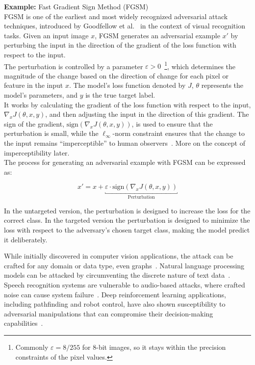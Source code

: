 \documentclass[a4paper, oneside]{discothesis}
\begin{document}
\begin{highlightbox}
	\textbf{Example:} Fast Gradient Sign Method (FGSM) \\

	FGSM is one of the earliest and most widely recognized adversarial attack techniques, introduced by Goodfellow et al.~\cite{goodfellow2014explaining} in the context of visual recognition tasks. Given an input image $x$, FGSM generates an adversarial example $x'$ by perturbing the input in the direction of the gradient of the loss function with respect to the input.\\

	The perturbation is controlled by a parameter $\varepsilon > 0$~\footnote{Commonly $\varepsilon = 8/255$ for 8-bit images, so it stays within the precision constraints of the pixel values.}, which determines the magnitude of the change based on the direction of change for each pixel or feature in the input $x$. The model's loss function denoted by $J$, $\theta$ represents the model's parameters, and $y$ is the true target label. \\
	
	It works by calculating the gradient of the loss function with respect to the input, $\nabla_x J(\theta, x, y)$, and then adjusting the input in the direction of this gradient. The sign of the gradient, $\text{sign}(\nabla_x J(\theta, x, y))$, is used to ensure that the perturbation is small, while the $\ell_\infty$-norm constraint ensures that the change to the input remains ``imperceptible'' to human observers~\cite{goodfellow2014explaining, zhang2019adversarial}. More on the concept of imperceptibility later.\\
	
	The process for generating an adversarial example with FGSM can be expressed as:
	
	$$x' = x + \underbracket{\varepsilon \cdot \text{sign}(\nabla_x J(\theta, x, y))}_{\text{Perturbation}}$$
	
	In the untargeted version, the perturbation is designed to increase the loss for the correct class. In the targeted version the perturbation is designed to minimize the loss with respect to the adversary's chosen target class, making the model predict it deliberately.
\end{highlightbox}

While initially discovered in computer vision applications, the attack can be crafted for any domain or data type, even graphs~\cite{Kashyap2024AdversarialAA}. Natural language processing models can be attacked by circumventing the discrete nature of text data~\cite{Han2022TextAA, meng2020geometry, yang2024assessing}. Speech recognition systems are vulnerable to audio-based attacks, where crafted noise can cause system failure~\cite{rajaratnam2018noise}. Deep reinforcement learning applications, including pathfinding and robot control, have also shown susceptibility to adversarial manipulations that can compromise their decision-making capabilities~\cite{Bai2018AdversarialEC}.
\end{document}
